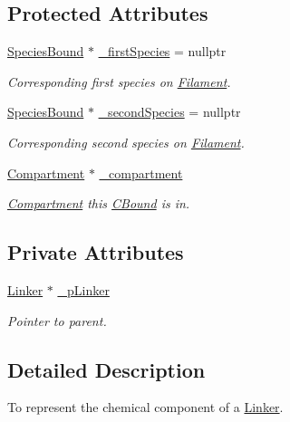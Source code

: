 \subsection*{Protected Attributes}
\begin{DoxyCompactItemize}
\item 
\hyperlink{classSpeciesBound}{Species\+Bound} $\ast$ \hyperlink{classCBound_a7ee4f44fd39c414be1f7b74b1031c1ce}{\+\_\+first\+Species} = nullptr
\begin{DoxyCompactList}\small\item\em Corresponding first species on \hyperlink{classFilament}{Filament}. \end{DoxyCompactList}\item 
\hyperlink{classSpeciesBound}{Species\+Bound} $\ast$ \hyperlink{classCBound_ae6818ab861d273598a2507be75183e41}{\+\_\+second\+Species} = nullptr
\begin{DoxyCompactList}\small\item\em Corresponding second species on \hyperlink{classFilament}{Filament}. \end{DoxyCompactList}\item 
\hyperlink{classCompartment}{Compartment} $\ast$ \hyperlink{classCBound_a95a66719b898cf32e60ae7137186bbbf}{\+\_\+compartment}
\begin{DoxyCompactList}\small\item\em \hyperlink{classCompartment}{Compartment} this \hyperlink{classCBound}{C\+Bound} is in. \end{DoxyCompactList}\end{DoxyCompactItemize}
\subsection*{Private Attributes}
\begin{DoxyCompactItemize}
\item 
\hyperlink{classLinker}{Linker} $\ast$ \hyperlink{classCLinker_a5cb1a9ff49e6d394ab980ff01af23ebc}{\+\_\+p\+Linker}
\begin{DoxyCompactList}\small\item\em Pointer to parent. \end{DoxyCompactList}\end{DoxyCompactItemize}


\subsection{Detailed Description}
To represent the chemical component of a \hyperlink{classLinker}{Linker}. 

